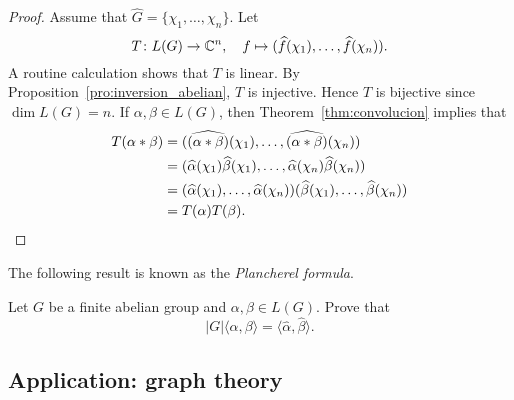 \begin{proof}
  Assume that $\widehat{G}=\{\chi_1,\dots,\chi_n\}$. 
  Let 
  \[
  T\colon L(G)\to\mathbb{C}^n,
  \quad
  f\mapsto(\widehat{f}(\chi_1),\dots,\widehat{f}(\chi_n)).
  \]
  A routine calculation shows that $T$ is linear. By 
  Proposition~\ref{pro:inversion_abelian}, 
  $T$ is injective. Hence $T$ is bijective since
  $\dim L(G)=n$. If $\alpha,\beta\in L(G)$, then Theorem~\ref{thm:convolucion} implies that 
  \begin{align*}
    T(\alpha*\beta)&=(\widehat{(\alpha*\beta)}(\chi_1),\dots,\widehat{(\alpha*\beta)}(\chi_n))\\
    &=(\widehat{\alpha}(\chi_1)\widehat{\beta}(\chi_1),\dots,\widehat{\alpha}(\chi_n)\widehat{\beta}(\chi_n))\\
    &=(\widehat{\alpha}(\chi_1),\dots,\widehat{\alpha}(\chi_n))(\widehat{\beta}(\chi_1),\dots,\widehat{\beta}(\chi_n))\\
    &=T(\alpha)T(\beta).\qedhere 
  \end{align*}
\end{proof}

The following result is known as the \emph{Plancherel formula}.

\begin{exercise}
  Let $G$ be a finite abelian group and $\alpha,\beta\in L(G)$. Prove that  \[
  |G|\langle \alpha,\beta\rangle=\langle\widehat{\alpha},\widehat{\beta}\rangle.
  \]
\end{exercise}


\subsection{Application: graph theory}

